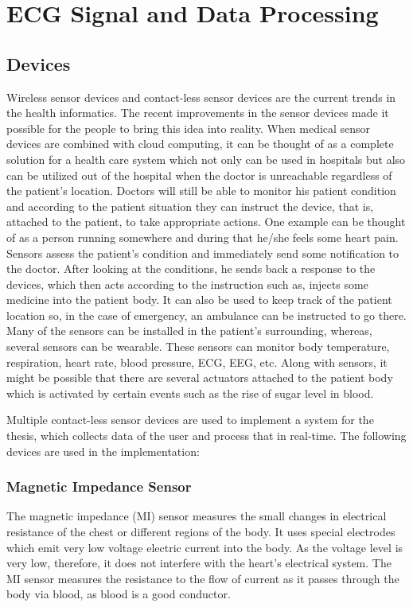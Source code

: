 \chapter{ECG Signal and Data Processing}


\section{Devices}

Wireless sensor devices and contact-less sensor devices are the current trends in the health informatics. The recent improvements in the sensor devices made it possible for the people to bring this idea
into reality. When  medical sensor devices are combined with cloud computing, it can be thought of as a complete
solution for a health care system which not only can be used
in hospitals but also can be utilized out of the hospital when
the doctor is unreachable regardless of the patient's location.
Doctors will still be able to monitor his patient condition and
according to the patient situation they can instruct the device,
that is, attached to the patient, to take appropriate actions.
One example can be thought of as a person running somewhere and during that he/she feels some heart pain. Sensors assess the patient's condition and immediately send some notification to the doctor. After looking at the conditions, he sends back a response to the devices, which then acts according to the instruction such as, injects some medicine into the patient body. It can also be used to keep track of the patient location so, in the case of emergency, an ambulance can be instructed to go there.
Many of the sensors can be installed in the patient's surrounding, whereas,
several sensors can be wearable. These sensors can monitor
body temperature, respiration, heart rate, blood pressure, ECG, EEG, etc.
Along with sensors, it might be possible that there are several
actuators attached to the patient body which is activated by
certain events such as the rise of sugar level in blood.

Multiple contact-less sensor devices are used to implement a system for the thesis, which collects data of the user and process that in real-time. The following devices are used in the implementation:

\subsection{Magnetic Impedance Sensor}

The magnetic impedance (MI) sensor measures the small changes in electrical resistance of the chest or different regions of the body. It uses special electrodes which emit very low voltage electric current into the body. As the voltage level is very low, therefore, it does not interfere with the heart's electrical system. The MI sensor measures the resistance to the flow of current as it passes through the body via blood, as blood is a good conductor.

